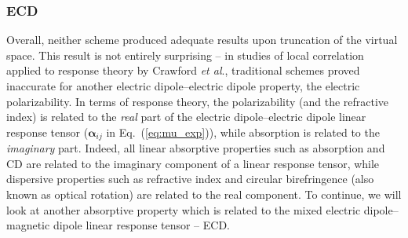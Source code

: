\subsubsection{ECD} \label{sss:ecd}
Overall, neither scheme produced adequate results upon truncation of the virtual space. 
This result is not entirely surprising -- in studies of local correlation applied to 
response theory by Crawford \textit{et al}., 
\cite{McAlexander2016,Kumar2017,Crawford2019,DCunha2021} 
traditional schemes proved inaccurate for another 
electric dipole--electric dipole property, the electric polarizability.
In terms of response theory,
the polarizability (and the refractive index) is related to the \textit{real} part 
of the electric dipole--electric dipole linear response tensor 
($\boldsymbol{\alpha}_{ij}$ in Eq.~(\ref{eq:mu_exp})), 
while absorption
is related to the \textit{imaginary} part. Indeed, all linear absorptive properties
such as absorption and CD 
are related to the imaginary component of a linear response tensor, while dispersive 
properties such as refractive index and 
circular birefringence (also known as optical rotation)
are related to the real component.
\cite{Barron2004,Norman2011}
To continue, we will look at another absorptive property which is related to the mixed
electric dipole--magnetic dipole linear response tensor -- ECD.

